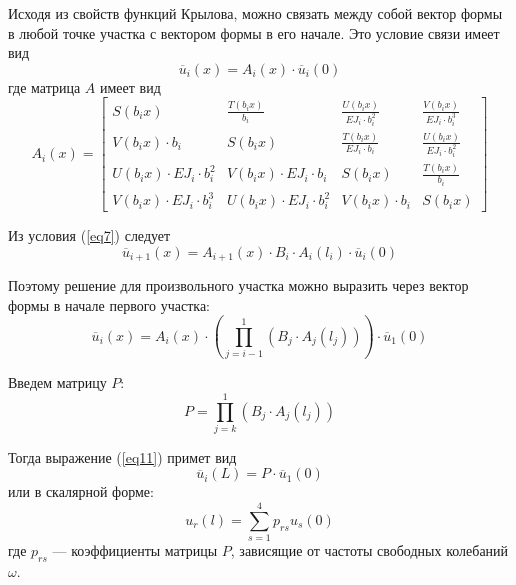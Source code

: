 Исходя из свойств функций Крылова, можно связать между собой вектор формы в любой точке участка с вектором формы в его начале. Это условие связи имеет вид
\begin{equation}
    \label{eq8}
    \overline{u}_i(x) = A_i(x) \cdot \overline{u}_i(0)
\end{equation}
где матрица $A$ имеет вид
\begin{equation}
    \label{eq9}
    A_i(x) = 
    \begin{bmatrix}
        S(b_ix) & \displaystyle \frac{T(b_ix)}{b_i} & \displaystyle \frac{U(b_ix)}{EJ_i \cdot b_i^2} & \displaystyle \frac{V(b_ix)}{EJ_i \cdot b_i^3}
        \\[10pt]
        V(b_ix) \cdot b_i & S(b_ix) & \displaystyle \frac{T(b_ix)}{EJ_i \cdot b_i} & \displaystyle \frac{U(b_ix)}{EJ_i \cdot b_i^2}
        \\[10pt]
        U(b_ix) \cdot EJ_i \cdot b_i^2 & V(b_ix) \cdot EJ_i \cdot b_i & S(b_ix) & \displaystyle \frac{T(b_ix)}{b_i}
        \\[10pt]
        V(b_ix) \cdot EJ_i \cdot b_i^3 & U(b_ix) \cdot EJ_i \cdot b_i^2 & V(b_ix) \cdot b_i & S(b_ix)
    \end{bmatrix}
\end{equation}

Из условия (\ref{eq7}) следует
\begin{equation}
    \label{eq10}
    \overline{u}_{i+1}(x) = A_{i+1}(x) \cdot B_i \cdot A_i(l_i) \cdot\overline{u}_i(0)
\end{equation}

Поэтому решение для произвольного участка можно выразить через вектор формы в начале первого участка:
\begin{equation}
    \label{eq11}
    \overline{u}_i(x) = A_i(x) \cdot \left( \prod_{j=i-1}^{1} \left( B_j \cdot A_j(l_j) \right) \right) \cdot \overline{u}_1(0)
\end{equation}

Введем матрицу $P$:
\begin{equation}
    \label{eq12}
    P = \prod_{j=k}^{1} \left( B_j \cdot A_j(l_j) \right)
\end{equation}

Тогда выражение (\ref{eq11}) примет вид
\begin{equation}
    \label{eq13}
    \overline{u}_i(L) = P \cdot \overline{u}_1(0)
\end{equation}
или в скалярной форме:
\begin{equation}
    \label{eq14}
    u_r(l) = \sum_{s=1}^{4} p_{rs} u_s(0)
\end{equation}
где $p_{rs}$ --- коэффициенты матрицы $P$, зависящие от частоты свободных колебаний $\omega$.

